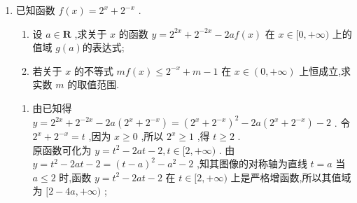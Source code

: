 \begin{enumerate}
\begin{jieda}
\begin{enumerate}
                综上所述, $2 \leq  a \leq  3$ .
            \end{enumerate}
        \end{jieda}
        \item 已知函数 $f\left( x\right)  = {2}^{x} + {2}^{-x}$ .
        \begin{enumerate}
            \item 设 $a \in  \mathbf{R}$ ,求关于 $x$ 的函数 $y = {2}^{2x} + {2}^{-{2x}} - {2af}\left( x\right)$ 在 $x \in  \lbrack 0, + \infty )$ 上的值域 $g\left( a\right)$的表达式;
            \item 若关于 $x$ 的不等式 ${mf}\left( x\right)  \leq  {2}^{-x} + m - 1$ 在 $x \in  \left( {0, + \infty }\right)$ 上恒成立,求实数 $m$ 的取值范围.
        \end{enumerate}
        \begin{jieda}
            \begin{enumerate}
                \item 由已知得 $y = {2}^{2x} + {2}^{-{2x}} - {2a}\left( {{2}^{x} + {2}^{-x}}\right)  = {\left( {2}^{x} + {2}^{-x}\right) }^{2} - {2a}\left( {{2}^{x} + {2}^{-x}}\right)  - 2$ .
                令 ${2}^{x} + {2}^{-x} = t$ ,因为 $x \geq  0$ ,所以 ${2}^{x} \geq  1$ ,得 $t \geq  2$ . \\
                原函数可化为 $y = {t}^{2} - {2at} - 2,t \in  \lbrack 2, + \infty )$ .
                由 $y = {t}^{2} - {2at} - 2 = {\left( t - a\right) }^{2} - {a}^{2} - 2$ ,知其图像的对称轴为直线 $t = a$
                当 $a \leq  2$ 时,函数 $y = {t}^{2} - {2at} - 2$ 在 $t \in  \lbrack 2, + \infty )$ 上是严格增函数,所以其值域为 $\lbrack 2 - {4a}, + \infty )$ ;

\end{enumerate}
\end{jieda}
\end{enumerate}
